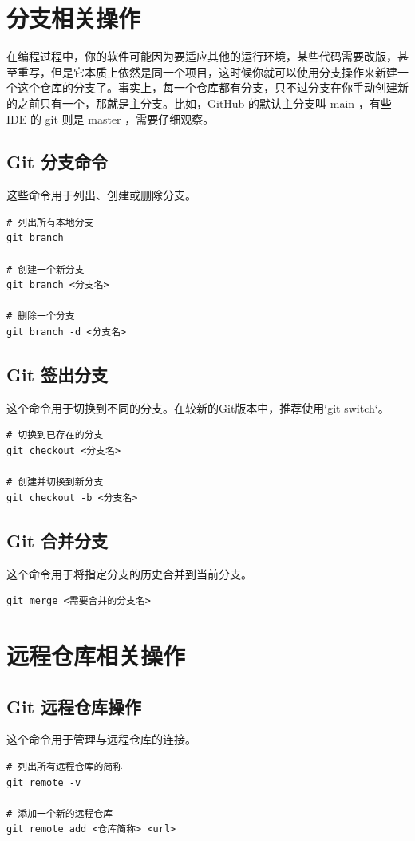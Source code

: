 \documentclass[UTF8]{gyh}
\begin{document}
\section{分支相关操作}

在编程过程中，你的软件可能因为要适应其他的运行环境，某些代码需要改版，甚至重写，但是它本质上依然是同一个项目，这时候你就可以使用分支操作来新建一个这个仓库的分支了。事实上，每一个仓库都有分支，只不过分支在你手动创建新的之前只有一个，那就是主分支。比如，GitHub 的默认主分支叫 main ，有些 IDE 的 git 则是 master ，需要仔细观察。

\subsection{Git 分支命令}
这些命令用于列出、创建或删除分支。
\begin{lstlisting}
# 列出所有本地分支
git branch

# 创建一个新分支
git branch <分支名>

# 删除一个分支
git branch -d <分支名>
\end{lstlisting}

\subsection{Git 签出分支}
这个命令用于切换到不同的分支。在较新的Git版本中，推荐使用`git switch`。
\begin{lstlisting}
# 切换到已存在的分支
git checkout <分支名>

# 创建并切换到新分支
git checkout -b <分支名>
\end{lstlisting}

\subsection{Git 合并分支}
这个命令用于将指定分支的历史合并到当前分支。
\begin{lstlisting}
git merge <需要合并的分支名>
\end{lstlisting}

\section{远程仓库相关操作}

\subsection{Git 远程仓库操作}
这个命令用于管理与远程仓库的连接。
\begin{lstlisting}
# 列出所有远程仓库的简称
git remote -v

# 添加一个新的远程仓库
git remote add <仓库简称> <url>
\end{lstlisting}
\end{document}
